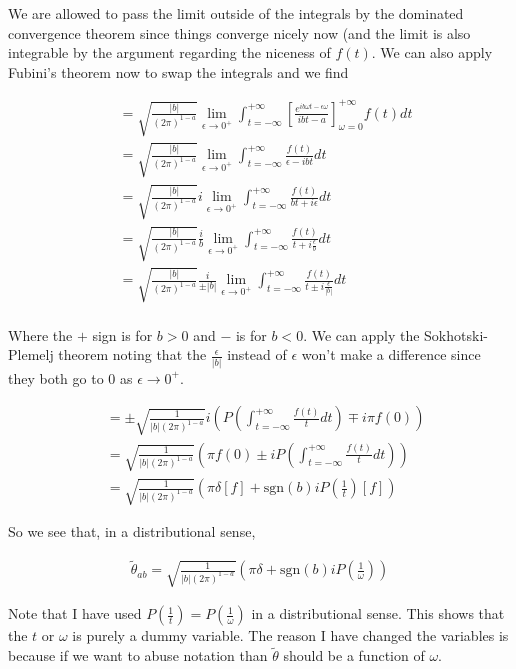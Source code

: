 \documentclass[12pt]{article}
\begin{document}
We are allowed to pass the limit outside of the integrals by the dominated convergence theorem since things converge nicely now (and the limit is also integrable by the argument regarding the niceness of $f(t)$. We can also apply Fubini's theorem now to swap the integrals and we find

\begin{align}
&= \sqrt{\frac{|b|}{(2\pi)^{1-a}}} \lim_{\epsilon \to 0^+} \int_{t=-\infty}^{+\infty} \left[\frac{e^{i b\omega t - \epsilon \omega}}{ibt-a}\right]_{\omega=0}^{+\infty} f(t) dt\\
&=\sqrt{\frac{|b|}{(2\pi)^{1-a}}}  \lim_{\epsilon \to 0^+} \int_{t=-\infty}^{+\infty} \frac{f(t)}{\epsilon - i b t} dt\\
&=\sqrt{\frac{|b|}{(2\pi)^{1-a}}} i \lim_{\epsilon \to 0^+} \int_{t=-\infty}^{+\infty} \frac{f(t)}{bt+i\epsilon} dt\\
&=\sqrt{\frac{|b|}{(2\pi)^{1-a}}} \frac{i}{b} \lim_{\epsilon \to 0^+} \int_{t=-\infty}^{+\infty} \frac{f(t)}{t+i\frac{\epsilon}{b}} dt\\
&=\sqrt{\frac{|b|}{(2\pi)^{1-a}}} \frac{i}{\pm|b|} \lim_{\epsilon \to 0^+} \int_{t=-\infty}^{+\infty} \frac{f(t)}{t\pm i\frac{\epsilon}{|b|}} dt\\
\end{align}

Where the $+$ sign is for $b>0$ and $-$ is for $b<0$. We can apply the Sokhotski-Plemelj theorem noting that the $\frac{\epsilon}{|b|}$ instead of $\epsilon$ won't make a difference since they both go to $0$ as $\epsilon \to 0^+$.

\begin{align}
&=\pm \sqrt{\frac{1}{|b|(2\pi)^{1-a}}} i\left(P\left(\int_{t=-\infty}^{+\infty} \frac{f(t)}{t} dt\right) \mp i \pi f(0)\right)\\
&= \sqrt{\frac{1}{|b|(2\pi)^{1-a}}} \left(\pi f(0) \pm iP\left(\int_{t=-\infty}^{+\infty} \frac{f(t)}{t} dt\right)\right)\\
&= \sqrt{\frac{1}{|b|(2\pi)^{1-a}}} \left(\pi \delta[f] + \text{sgn}(b) i P\left(\frac{1}{t}\right)[f]\right)
\end{align}


So we see that, in a distributional sense,

\begin{align}
\tilde{\theta}_{ab} = \sqrt{\frac{1}{|b|(2\pi)^{1-a}}}\left(\pi \delta + \text{sgn}(b) iP\left(\frac{1}{\omega}\right)\right)
\end{align}

Note that I have used $P\left(\frac{1}{t}\right) = P\left(\frac{1}{\omega}\right)$ in a distributional sense. This shows that the $t$ or $\omega$ is purely a dummy variable. The reason I have changed the variables is because if we want to abuse notation than $\tilde{\theta}$ should be a function of $\omega$.
\end{document}
